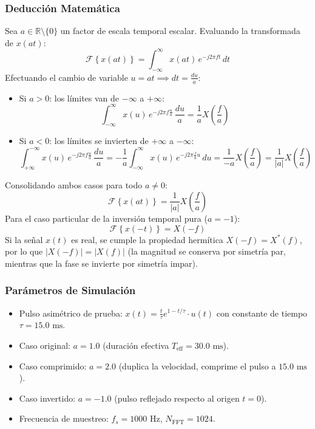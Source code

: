 \documentclass[11pt,a4paper]{article}
\begin{document}
\subsubsection{Deducci\'on Matem\'atica}
Sea $a \in \mathbb{R} \setminus \{0\}$ un factor de escala temporal escalar. Evaluando la transformada de $x(at)$:
\begin{equation}
  \mathcal{F}\left\{ x(at) \right\} = \int_{-\infty}^{\infty} x(at) \, e^{-j 2\pi f t} \, dt
\end{equation}
Efectuando el cambio de variable $u = at \implies dt = \frac{du}{a}$:
\begin{itemize}
  \item Si $a > 0$: los l\'imites van de $-\infty$ a $+\infty$:
  \begin{equation}
    \int_{-\infty}^{\infty} x(u) \, e^{-j 2\pi f \frac{u}{a}} \, \frac{du}{a} = \frac{1}{a} X\left(\frac{f}{a}\right)
  \end{equation}
  \item Si $a < 0$: los l\'imites se invierten de $+\infty$ a $-\infty$:
  \begin{equation}
    \int_{+\infty}^{-\infty} x(u) \, e^{-j 2\pi f \frac{u}{a}} \, \frac{du}{a} = -\frac{1}{a} \int_{-\infty}^{\infty} x(u) \, e^{-j 2\pi \frac{f}{a} u} \, du = \frac{1}{-a} X\left(\frac{f}{a}\right) = \frac{1}{|a|} X\left(\frac{f}{a}\right)
  \end{equation}
\end{itemize}
Consolidando ambos casos para todo $a \ne 0$:
\begin{equation}
  \mathcal{F}\left\{ x(at) \right\} = \frac{1}{|a|} X\left(\frac{f}{a}\right)
  \label{eq:scaling}
\end{equation}
Para el caso particular de la inversi\'on temporal pura ($a = -1$):
\begin{equation}
  \mathcal{F}\left\{ x(-t) \right\} = X(-f)
  \label{eq:time_reversal}
\end{equation}
Si la se\~nal $x(t)$ es real, se cumple la propiedad herm\'itica $X(-f) = X^*(f)$, por lo que $|X(-f)| = |X(f)|$ (la magnitud se conserva por simetr\'ia par, mientras que la fase se invierte por simetr\'ia impar).

\subsubsection{Par\'ametros de Simulaci\'on}
\begin{itemize}[noitemsep]
  \item Pulso asim\'etrico de prueba: $x(t) = \frac{t}{\tau} e^{1 - t/\tau} \cdot u(t)$ con constante de tiempo $\tau = 15.0\text{ ms}$.
  \item Caso original: $a = 1.0$ (duraci\'on efectiva $T_{\text{eff}} = 30.0\text{ ms}$).
  \item Caso comprimido: $a = 2.0$ (duplica la velocidad, comprime el pulso a $15.0\text{ ms}$).
  \item Caso invertido: $a = -1.0$ (pulso reflejado respecto al origen $t = 0$).
  \item Frecuencia de muestreo: $f_s = 1000\text{ Hz}$, $N_{\text{FFT}} = 1024$.
\end{itemize}
\end{document}
